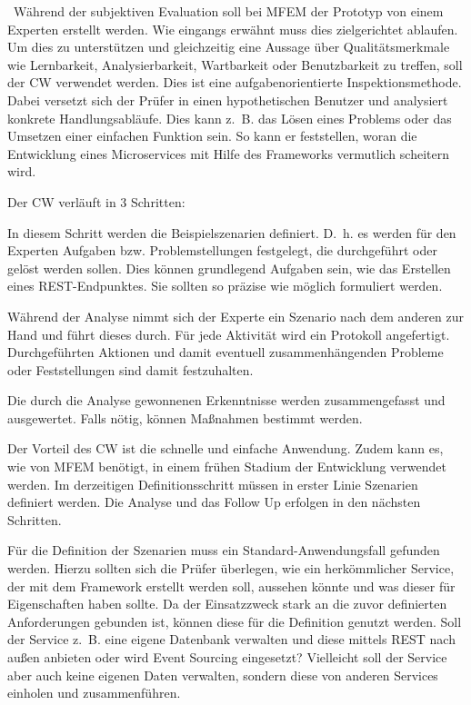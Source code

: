 \
Während der subjektiven Evaluation soll bei \ac{MFEM} der Prototyp von einem Experten erstellt werden. Wie eingangs erwähnt muss dies zielgerichtet ablaufen. Um dies zu unterstützen und gleichzeitig eine Aussage über Qualitätsmerkmale wie Lernbarkeit, Analysierbarkeit, Wartbarkeit oder Benutzbarkeit zu treffen, soll der \ac{CW} verwendet werden. Dies ist eine aufgabenorientierte Inspektionsmethode\cite{Hegner2016}. Dabei versetzt sich der Prüfer in einen hypothetischen Benutzer und analysiert konkrete Handlungsabläufe. Dies kann z.~B. das Lösen eines Problems oder das Umsetzen einer einfachen Funktion sein. 
So kann er feststellen, woran die Entwicklung eines Microservices mit Hilfe des Frameworks vermutlich scheitern wird.

Der \ac{CW} verläuft in 3 Schritten\cite{Hegner2016}:

\begin{description}[leftmargin=!,labelwidth=\widthof{\bfseries Input definieren}]
	\item[1. Vorbereitung]
	In diesem Schritt werden die Beispielszenarien definiert. D.~h. es werden für den Experten Aufgaben bzw. Problemstellungen festgelegt, die durchgeführt oder gelöst werden sollen. Dies können grundlegend Aufgaben sein, wie das Erstellen eines \ac{REST}-Endpunktes. Sie sollten so präzise wie möglich formuliert werden.
	\item[2. Analyse]
	Während der Analyse nimmt sich der Experte ein Szenario nach dem anderen zur Hand und führt dieses durch. Für jede Aktivität wird ein Protokoll angefertigt. Durchgeführten Aktionen und damit eventuell zusammenhängenden Probleme oder Feststellungen sind damit festzuhalten.
	\item[3. Follow Up]
	Die durch die Analyse gewonnenen Erkenntnisse werden zusammengefasst und ausgewertet. Falls nötig, können Maßnahmen bestimmt werden.
\end{description}

Der Vorteil des \ac{CW} ist die schnelle und einfache Anwendung. Zudem kann es, wie von \ac{MFEM} benötigt, in einem frühen Stadium der Entwicklung verwendet werden.\cite{Wharton1994} 
Im derzeitigen Definitionsschritt müssen in erster Linie Szenarien definiert werden. Die Analyse und das Follow Up erfolgen in den nächsten Schritten.

\label{Definition_Szenarien}

Für die Definition der Szenarien muss ein Standard-Anwendungsfall gefunden werden. Hierzu sollten sich die Prüfer überlegen, wie ein herkömmlicher Service, der mit dem Framework erstellt werden soll, aussehen könnte und was dieser für Eigenschaften haben sollte. Da der Einsatzzweck stark an die zuvor definierten Anforderungen gebunden ist, können diese für die Definition genutzt werden. Soll der Service z.~B. eine eigene Datenbank verwalten und diese mittels \ac{REST} nach außen anbieten oder wird Event Sourcing eingesetzt? Vielleicht soll der Service aber auch keine eigenen Daten verwalten, sondern diese von anderen Services einholen und zusammenführen.

